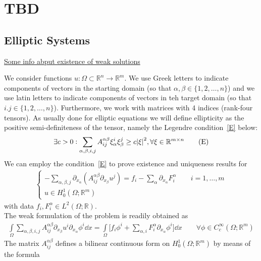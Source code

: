 \chapter{TBD}

\section{Elliptic Systems}
\underline{Some info abput existence of weak solutions}

We consider functions \(u: \Omega \subset \mathbb{R}^{n} \to \mathbb{R}^{m}\). We use Greek letters to indicate components of vectors in the starting domain (so that \(\alpha,\beta \in \{1,2,\dots,n\} \)) and we use latin letters to indicate components of vectors in teh target domain (so that \(i.j \in \{1,2,\dots,n\} \)). Furthermore, we work with matrices with 4 indices (rank-four tensors). As usually done for elliptic equations we will define ellipticity as the positive semi-definiteness of the tensor, namely the Legendre condition~\eqref{E} below:
\begin{gather}
    \exists c > 0 : \sum_{\alpha,\beta,i,j} A_{ij}^{\alpha\beta} \xi_{\alpha}^{i} \xi_{\beta}^{j} \geq c \abs{\xi}^{2}, \forall \xi \in \mathbb{R}^{m \times n} \tag{E}\label{E}
\end{gather}
We can employ the condition~\eqref{E} to prove existence and uniqueness results for
\begin{gather}
    \begin{cases}
         - \sum_{\alpha, \beta, j} \partial_{x_\alpha} (A_{ij}^{\alpha \beta} \partial_{x_{\beta}} u^{j}) = f_{i} - \sum_{\alpha}^{} \partial_{x_{\alpha}} F_{i}^{\alpha}\qquad i=1,\dots,m \\
         u \in H_{0}^{1}(\Omega; \mathbb{R}^{m})    
    \end{cases} \tag{LS}\label{LS}
\end{gather}
with data \(f_{i},F_{i}^{\alpha} \in L^{2}(\Omega;\mathbb{R})\).\\
The weak formulation of the problem is readily obtained as
\begin{gather}
    \int\limits_{\Omega}^{} \sum_{\alpha, \beta, i,j}^{} A_{ij}^{\alpha \beta} \partial_{x_{\beta}} u^{i} \partial_{x_{\alpha}} \phi^{i} \dd{x} = \int\limits_{\Omega}^{} \Big[f_{i} \phi^{i} + \sum_{\alpha,i}^{} F_{i}^{\alpha} \partial_{x_{\alpha}} \phi^{i} \Big] \dd{x} \qquad \forall \phi \in C_c^\infty(\Omega;\mathbb{R}^{m})
\end{gather}
The matrix \(A_{ij}^{\alpha \beta}\) defines a bilinear continuous form on \(H_0^1(\Omega;\mathbb{R}^{m})\) by means of the formula

